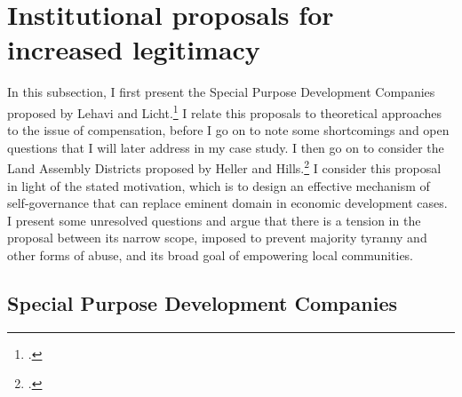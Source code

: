 \documentclass[12pt,a4paper]{book} %
\begin{document}
%

\section{Institutional proposals for increased legitimacy}\label{sec:ir}

In this subsection, I first present the Special Purpose Development Companies proposed by Lehavi and Licht.\footcite{lehavi07} I relate this proposals to theoretical approaches to the issue of compensation, before I go on to note some shortcomings and open questions that I will later address in my case study. I then go on to consider the Land Assembly Districts proposed by Heller and Hills.\footcite{heller08} I consider this proposal in light of the stated motivation, which is to design an effective mechanism of self-governance that can replace eminent domain in economic development cases. I present some unresolved questions and argue that there is a tension in the proposal between its narrow scope, imposed to prevent majority tyranny and other forms of abuse, and its broad goal of empowering local communities. 

\subsection{Special Purpose Development Companies}
\end{document}
